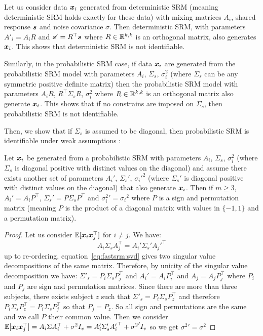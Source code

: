 Let us consider data $\boldsymbol{x}_i$ generated from deterministic SRM (meaning
deterministic SRM holds exactly for these data) with
mixing matrices $A_i$, shared response $\boldsymbol{s}$ and noise covariance $\sigma$.
Then deterministic SRM, with parameters $A'_i = A_i R$ and $\boldsymbol{s}' = R^{\top} \boldsymbol{s}$ where
$R \in \mathbb{R}^{k, k}$ is an orthogonal matrix, also
generates $\boldsymbol{x}_i$.
This shows that deterministic SRM is not identifiable.

Similarly, in the probabilistic SRM case, if data $\boldsymbol{x}_i$ are generated from the
probabilistic SRM model with 
parameters $A_i$, $\Sigma_s$, $\sigma_i^2$ (where $\Sigma_s$ can be any
symmetric positive definite
matrix) then the probabilistic SRM model with parameters $A_iR$, $R^{\top} \Sigma_s R$, $\sigma_i^2$  where
$R \in \mathbb{R}^{k, k}$ is an orthogonal matrix also generate $\boldsymbol{x}_i$.
This shows that if no constrains are imposed on $\Sigma_s$,
then probabilistic SRM is not identifiable.


Then, we show that if $\Sigma_s$ is assumed to be diagonal, then probabilistic
SRM is identifiable under weak assumptions :
\begin{prop}
  \label{prop:fastsrm:identifiability}
  Let $\boldsymbol{x}_i$ be generated from a probabilistic SRM with parameters 
  $A_i$, $\Sigma_s$, $\sigma_i^2$ (where $\Sigma_s$ is diagonal positive with
  distinct values on the diagonal) and assume there exists another set of parameters $A_i'$, $\Sigma_s'$,
  ${\sigma_i'}^2$ (where $\Sigma_s'$ is diagonal positive with
  distinct values on the diagonal) that also generate $\boldsymbol{x}_i$.
Then if $m\geq 3$, $A_i' = A_i P^{\top}$, $\Sigma_s'= P\Sigma_sP^{\top}$ and
  ${\sigma_i^2}' = {\sigma_i}^2$ where $P$ is a sign and permutation matrix
  (meaning $P$ is the product of a diagonal matrix with values in $\{-1, 1\}$
  and a permutation matrix).
\end{prop}
\begin{proof}
  Let us consider $\mathbb{E}[\boldsymbol{x}_i \boldsymbol{x}_j^{\top}]$ for $i \neq j$.
  We have:
  \begin{equation}
  A_i \Sigma_s A_j^{\top} = A_i' \Sigma_s' {A_j'}^{\top}
  \label{eq:fastsrm:svd}
  \end{equation}
  up to re-ordering, equation~\eqref{eq:fastsrm:svd} gives two singular value
  decompositions of the same matrix.
  Therefore, by unicity of the singular value decomposition we have:
  $\Sigma'_s = P_i \Sigma_s P_j^{\top}$ and $A_i' = A_i P_i^{\top}$ and $A_j =
  A_j P_j^{\top}$ where $P_i$ and $P_j$ are sign and permutation matrices.
  Since there are more than three subjects, there exists subject $z$ such that
  $\Sigma'_s = P_i \Sigma_s P_z^{\top}$ and therefore
  $P_i \Sigma_s P_z^{\top} =  P_i \Sigma_s P_j^{\top}$ so that $P_j =
  P_z$. So all sign and permutations are the same and we call $P$ their
  common value.
  Then we consider
  $\mathbb{E}[\boldsymbol{x}_i \boldsymbol{x}_j^{\top}] = A_i \Sigma A_i^{\top} + \sigma^2 I_v = A_i' \Sigma_s'
  {A_i'}^{\top} + {\sigma^2}' I_v$
  so we get ${\sigma^2}' = {\sigma^2}$
\end{proof}

